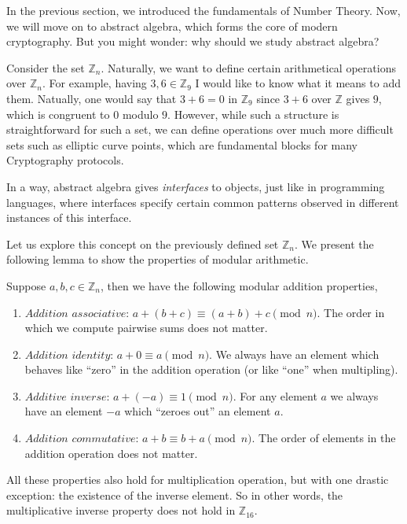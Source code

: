 \documentclass[../lecture-notes-148x210.tex]{subfiles}
\begin{document}
In the previous section, we introduced the fundamentals of Number Theory. 
Now, we will move on to abstract algebra, which forms the core of modern 
cryptography. But you might wonder: why should we study abstract algebra?

Consider the set $\mathbb{Z}_n$. Naturally, we want to define certain
arithmetical operations over $\mathbb{Z}_n$. For example, having $3, 6 \in
\mathbb{Z}_9$ I would like to know what it means to add them. Natually, one
would say that $3+6=0$ in $\mathbb{Z}_9$ since $3+6$ over $\mathbb{Z}$ gives $9$,
which is congruent to $0$ modulo $9$. However, while such a structure is
straightforward for such a set, we can define operations over much more
difficult sets such as elliptic curve points, which are fundamental blocks for
many Cryptography protocols.  

In a way, abstract algebra gives \textit{interfaces} to objects, just like in programming 
languages, where interfaces specify certain common patterns observed in different 
instances of this interface. 

Let us explore this concept on the previously defined set $\mathbb{Z}_n$. We present 
the following lemma to show the properties of modular arithmetic.

\begin{lemma}
    Suppose $a, b, c \in \mathbb{Z}_n$, then we have the following modular addition properties,

    \begin{enumerate}
        \item $\textit{Addition associative: } a + (b + c) \equiv (a + b) + c \pmod{n}$. The order in 
        which we compute pairwise sums does not matter.
        \item $\textit{Addition identity: } a + 0 \equiv a \pmod{n}$. We always have an element which 
        behaves like ``zero'' in the addition operation (or like ``one'' when multipling).
        \item $\textit{Additive inverse: } a + (-a) \equiv 1 \pmod{n}$. For any
        element $a$ we always have an element $-a$ which ``zeroes out'' an element $a$.
        \item $\textit{Addition commutative: } a + b \equiv b + a \pmod{n}$. The order of elements in
        the addition operation does not matter.
    \end{enumerate}
\end{lemma}

\begin{remark}
    All these properties also hold for multiplication operation, but with one 
    drastic exception: the existence of the inverse element. So in other words, the multiplicative 
    inverse property does not hold in $\mathbb{Z}_{16}$.
\end{remark}
\end{document}
